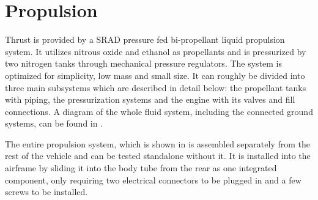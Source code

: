 \section{Propulsion} \label{sec:prop}

Thrust is provided by a SRAD pressure fed bi-propellant liquid propulsion system. It utilizes nitrous oxide and ethanol as propellants and is pressurized by two nitrogen tanks through mechanical pressure regulators. The system is optimized for simplicity, low mass and small size. It can roughly be divided into three main subsystems which are described in detail below: the propellant tanks with piping, the pressurization systems and the engine with its valves and fill connections. A diagram of the whole fluid system, including the connected ground systems, can be found in .

The entire propulsion system, which is shown in  is assembled separately from the rest of the vehicle and can be tested standalone without it. It is installed into the airframe by sliding it into the body tube from the rear as one integrated component, only requiring two electrical connectors to be plugged in and a few screws to be installed.

